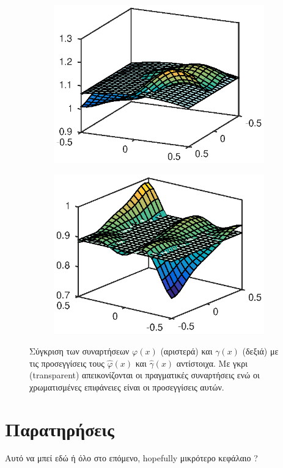 \begin{figure}
	\begin{subfigure}{0.5\textwidth}
		\includegraphics{plots/experiments/2dof/g21_hat.eps}
	\end{subfigure}
	\begin{subfigure}{0.5\textwidth}
		\includegraphics{plots/experiments/2dof/g22_hat.eps}
	\end{subfigure}
	\caption{Σύγκριση των συναρτήσεων $\varphi(x)$ (αριστερά) και $\gamma(x)$ (δεξιά) με τις προσεγγίσεις τους $\hat{\varphi}(x)$ και $\hat{\gamma}(x)$ αντίστοιχα. Με γκρι (transparent) απεικονίζονται οι πραγματικές συναρτήσεις ενώ οι χρωματισμένες επιφάνειες είναι οι προσεγγίσεις αυτών. }
	\label{fig:2dof_g2_approximations}
\end{figure}


\section{Παρατηρήσεις}
Αυτό να μπεί εδώ ή όλο στο επόμενο, hopefully μικρότερο κεφάλαιο ?
